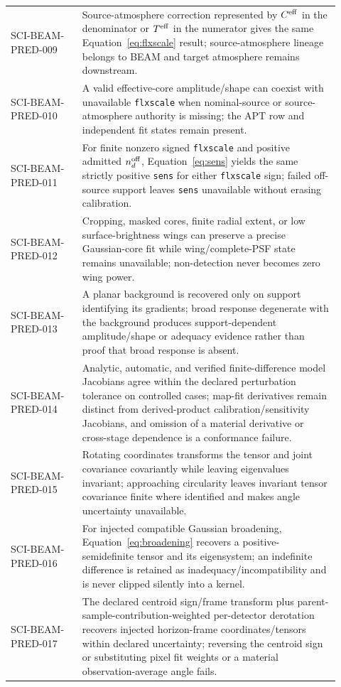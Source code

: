 \begin{longtable}{>{\raggedright\arraybackslash\ttfamily\scriptsize}p{0.20\linewidth}L{0.72\linewidth}}
SCI-BEAM-PRED-009 & Source-atmosphere correction represented by $C^{\rm eff}$ in the denominator or $T^{\rm eff}$ in the numerator gives the same Equation~\ref{eq:flxscale} result; source-atmosphere lineage belongs to BEAM and target atmosphere remains downstream. \\
SCI-BEAM-PRED-010 & A valid effective-core amplitude/shape can coexist with unavailable \texttt{flxscale} when nominal-source or source-atmosphere authority is missing; the APT row and independent fit states remain present. \\
SCI-BEAM-PRED-011 & For finite nonzero signed \texttt{flxscale} and positive admitted $n_d^{\rm off}$, Equation~\ref{eq:sens} yields the same strictly positive \texttt{sens} for either \texttt{flxscale} sign; failed off-source support leaves \texttt{sens} unavailable without erasing calibration. \\
SCI-BEAM-PRED-012 & Cropping, masked cores, finite radial extent, or low surface-brightness wings can preserve a precise Gaussian-core fit while wing/complete-PSF state remains unavailable; non-detection never becomes zero wing power. \\
SCI-BEAM-PRED-013 & A planar background is recovered only on support identifying its gradients; broad response degenerate with the background produces support-dependent amplitude/shape or adequacy evidence rather than proof that broad response is absent. \\
SCI-BEAM-PRED-014 & Analytic, automatic, and verified finite-difference model Jacobians agree within the declared perturbation tolerance on controlled cases; map-fit derivatives remain distinct from derived-product calibration/sensitivity Jacobians, and omission of a material derivative or cross-stage dependence is a conformance failure. \\
SCI-BEAM-PRED-015 & Rotating coordinates transforms the tensor and joint covariance covariantly while leaving eigenvalues invariant; approaching circularity leaves invariant tensor covariance finite where identified and makes angle uncertainty unavailable. \\
SCI-BEAM-PRED-016 & For injected compatible Gaussian broadening, Equation~\ref{eq:broadening} recovers a positive-semidefinite tensor and its eigensystem; an indefinite difference is retained as inadequacy/incompatibility and is never clipped silently into a kernel. \\
SCI-BEAM-PRED-017 & The declared centroid sign/frame transform plus parent-sample-contribution-weighted per-detector derotation recovers injected horizon-frame coordinates/tensors within declared uncertainty; reversing the centroid sign or substituting pixel fit weights or a material observation-average angle fails. \\

\end{longtable}

